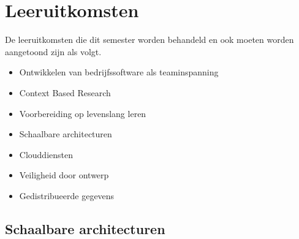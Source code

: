 \chapter{Leeruitkomsten}
\label{ch:learning_outcomes}

De leeruitkomsten die dit semester worden behandeld en ook moeten worden aangetoond zijn als volgt.

\begin{itemize}
	\item Ontwikkelen van bedrijfssoftware als teaminspanning
	\item Context Based Research
	\item Voorbereiding op levenslang leren
	\item Schaalbare architecturen
	\item Clouddiensten
	\item Veiligheid door ontwerp
	\item Gedistribueerde gegevens
\end{itemize}













\section{Schaalbare architecturen}\label{sec:schaalbare-architecturen}


